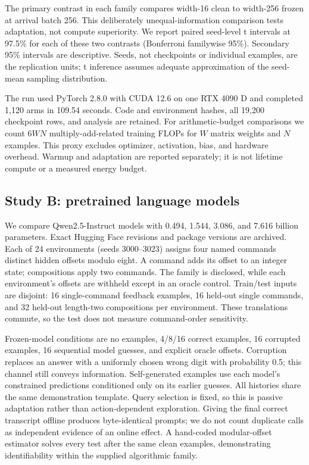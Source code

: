 \documentclass[11pt]{article}
\begin{document}
The primary contrast in each family compares width-16 clean to width-256
frozen at arrival batch 256. This deliberately unequal-information comparison
tests adaptation, not compute superiority. We report paired seed-level t
intervals at 97.5\% for each of these two contrasts (Bonferroni familywise
95\%). Secondary 95\% intervals are descriptive. Seeds, not checkpoints or
individual examples, are the replication units; t inference assumes adequate
approximation of the seed-mean sampling distribution.

The run used PyTorch 2.8.0 with CUDA 12.6 on one RTX 4090 D and completed
1,120 arms in 109.54 seconds. Code and environment hashes, all 19,200
checkpoint rows, and analysis are retained. For arithmetic-budget comparisons
we count $6WN$ multiply-add-related training FLOPs for $W$ matrix weights
and $N$ examples. This proxy excludes optimizer, activation, bias, and hardware
overhead. Warmup and adaptation are reported separately; it is not lifetime
compute or a measured energy budget.

\subsection{Study B: pretrained language models}
We compare Qwen2.5-Instruct models with 0.494, 1.544, 3.086, and 7.616 billion
parameters. Exact Hugging Face revisions and package versions are archived.
Each of 24 environments (seeds 3000--3023) assigns four named commands distinct
hidden offsets modulo eight. A command adds its offset to an integer state;
compositions apply two commands. The family is disclosed, while each
environment's offsets are withheld except in an oracle control. Train/test
inputs are disjoint: 16 single-command feedback examples, 16 held-out single
commands, and 32 held-out length-two compositions per environment. These
translations commute, so the test does not measure command-order sensitivity.

Frozen-model conditions are no examples, 4/8/16 correct examples, 16 corrupted
examples, 16 sequential model guesses, and explicit oracle offsets. Corruption
replaces an answer with a uniformly chosen wrong digit with probability 0.5;
this channel still conveys information. Self-generated examples use each
model's constrained predictions conditioned only on its earlier guesses.
All histories share the same demonstration template. Query selection is fixed,
so this is passive adaptation rather than action-dependent exploration.
Giving the final correct transcript offline produces byte-identical prompts;
we do not count duplicate calls as independent evidence of an online effect.
A hand-coded modular-offset estimator solves every test after the same clean
examples, demonstrating identifiability within the supplied algorithmic family.
\end{document}
